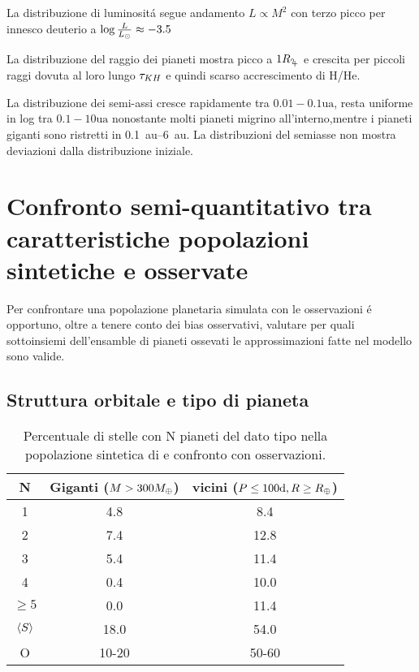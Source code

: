 \begin{workout}
La distribuzione di luminosit\'a segue andamento $L\propto M^2$ con terzo picco per innesco deuterio a $\log{\frac{L}{L_{\odot}}}\approx-3.5$
\end{workout}

La distribuzione del raggio dei pianeti mostra picco a $1\rjupiter$ e crescita per piccoli raggi dovuta al loro lungo $\tau_{KH}{}$ e quindi scarso accrescimento di H/He.

La distribuzione dei semi-assi cresce rapidamente tra $0.01-0.1\si{\astronomicalunit}$, resta uniforme in log tra $0.1-10\si{\astronomicalunit}$ nonostante molti pianeti migrino all'interno,mentre i pianeti giganti sono ristretti in \SIrange{0.1}{6}{\astronomicalunit}. La distribuzioni del semiasse non mostra deviazioni dalla distribuzione iniziale.

{\let\clearpage\relax\let\cleardoublepage\relax
\chapter{Confronto semi-quantitativo tra caratteristiche popolazioni sintetiche e osservate}
}

Per confrontare una popolazione planetaria simulata con le osservazioni \'e opportuno, oltre a tenere conto dei bias osservativi, valutare per quali sottoinsiemi dell'ensamble di pianeti ossevati le approssimazioni fatte nel modello sono valide.

\section{Struttura orbitale e tipo di pianeta}

\begin{table}
\begin{tabular}{|ccc|}
\hline
N&Giganti ($M>300M_{\oplus}{}$)&vicini ($P\leq100\si{\day}, R\geq\rearth{}$)\\
\hline
1&4.8&8.4\\
2&7.4&12.8\\
3&5.4&11.4\\
4&0.4&10.0\\
$\geq5$&0.0&11.4\\
$\langle S \rangle$&18.0&54.0\\
O&10-20&50-60\\
\hline
\end{tabular}
\caption{Percentuale di stelle con N pianeti del dato tipo nella popolazione sintetica di \cite{mordasini2018planetary} e confronto con osservazioni.}\label{planetfreq}
\end{table}


